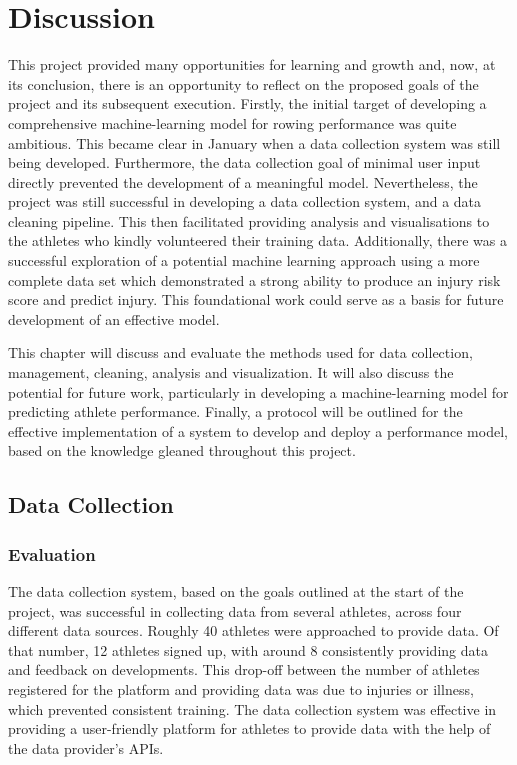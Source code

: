 \chapter{\label{ch:discussion}Discussion}
This project provided many opportunities for learning and growth and, now, at its conclusion, there is an opportunity to reflect on the proposed goals of the project and its subsequent execution. Firstly, the initial target of developing a comprehensive machine-learning model for rowing performance was quite ambitious. This became clear in January when a data collection system was still being developed. Furthermore, the data collection goal of minimal user input directly prevented the development of a meaningful model. Nevertheless, the project was still successful in developing a data collection system, and a data cleaning pipeline. This then facilitated providing analysis and visualisations to the athletes who kindly volunteered their training data. Additionally, there was a successful exploration of a potential machine learning approach using a more complete data set which demonstrated a strong ability to produce an injury risk score and predict injury. This foundational work could serve as a basis for future development of an effective model. 

This chapter will discuss and evaluate the methods used for data collection, management, cleaning, analysis and visualization. It will also discuss the potential for future work, particularly in developing a machine-learning model for predicting athlete performance. Finally, a protocol will be outlined for the effective implementation of a system to develop and deploy a performance model, based on the knowledge gleaned throughout this project.

\section{Data Collection}
\subsection{Evaluation}
The data collection system, based on the goals outlined at the start of the project, was successful in collecting data from several athletes, across four different data sources. Roughly 40 athletes were approached to provide data. Of that number, 12 athletes signed up, with around 8 consistently providing data and feedback on developments. This drop-off between the number of athletes registered for the platform and providing data was due to injuries or illness, which prevented consistent training. The data collection system was effective in providing a user-friendly platform for athletes to provide data with the help of the data provider's APIs. 

